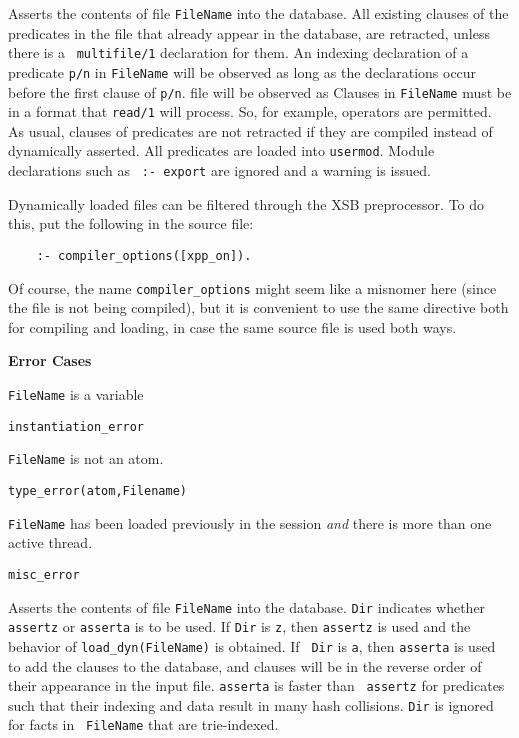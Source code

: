 \begin{description}
\label{load_dyn/1}
    Asserts the contents of file {\tt FileName} into the database.
    All existing clauses of the predicates in the file that already
    appear in the database, are retracted, unless there is a {\tt
    multifile/1} declaration for them.  An indexing declaration of a
    predicate {\tt p/n} in {\tt FileName} will be observed as long as
    the declarations occur before the first clause of {\tt p/n}.  file
    will be observed as Clauses in {\tt FileName} must be in a format
    that {\tt read/1} will process.  So, for example, operators are
    permitted.  As usual, clauses of predicates are not retracted if
    they are compiled instead of dynamically asserted.  All predicates
    are loaded into {\tt usermod}.  Module declarations such as {\tt
    :- export} are ignored and a warning is issued.

    Dynamically loaded files can be filtered through the XSB preprocessor.
    To do this, put the following in the source file: 
    \begin{verbatim}
    :- compiler_options([xpp_on]).      
    \end{verbatim}

    Of course, the name \verb|compiler_options| might seem like a misnomer
    here (since the file is not being compiled), but it is convenient to
    use the same directive both for compiling and loading, in case the same
    source file is used both ways.

{\bf Error Cases}
\bi
\item 	{\tt FileName} is a variable
 \bi
 \item 	{\tt instantiation\_error}
 \ei
\item 	{\tt FileName} is not an atom.
 \bi
 \item 	{\tt type\_error(atom,Filename)}
 \ei
\item {\tt FileName} has been loaded previously in the session {\em and}
  there is more than one active thread.  
 \bi
 \item 	{\tt misc\_error}
 \ei
%
\ei

\label{load_dyn/2}
    Asserts the contents of file {\tt FileName} into the database.
    {\tt Dir} indicates whether {\tt assertz} or {\tt asserta} is to
    be used.  If {\tt Dir} is {\tt z}, then {\tt assertz} is used and
    the behavior of {\tt load\_dyn(FileName)} is obtained.  If {\tt
    Dir} is {\tt a}, then {\tt asserta} is used to add the clauses to
    the database, and clauses will be in the reverse order of their
    appearance in the input file.  {\tt asserta} is faster than {\tt
    assertz} for predicates such that their indexing and data result
    in many hash collisions.  {\tt Dir} is ignored for facts in {\tt
    FileName} that are trie-indexed.


\end{description}

